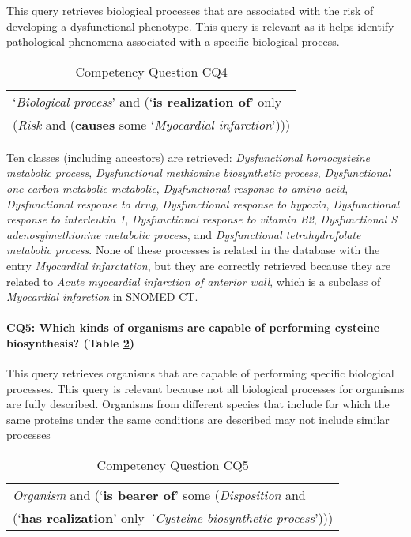 
This query retrieves biological processes that are associated with the risk of developing a dysfunctional phenotype. This query is relevant as it helps identify pathological phenomena associated with a specific biological process.
\begin{table}[H]
	\caption{Competency Question CQ4}
	\label{table:cq4}
	\centering
	\begin{tabular}{p{3in}}
		\hline
		`\textit{Biological process}' and (`\textbf{is realization of}' only \\ 
		\hspace{1cm}(\textit{Risk} and (\textbf{causes} some `\textit{Myocardial infarction}'))) \\
		\hline
	\end{tabular} 
\end{table}

Ten classes (including ancestors) are retrieved: \textit{Dysfunctional homocysteine metabolic process}, \textit{Dysfunctional methionine biosynthetic process}, \textit{Dysfunctional one carbon metabolic metabolic}, \textit{Dysfunctional response to amino acid}, \textit{Dysfunctional response to drug}, \textit{Dysfunctional response to hypoxia}, \textit{Dysfunctional response to interleukin 1}, \textit{Dysfunctional response to vitamin B2}, \textit{Dysfunctional S adenosylmethionine metabolic process}, and \textit{Dysfunctional tetrahydrofolate metabolic process}. None of these processes is related in the database with the entry \textit{Myocardial infarctation}, but they are correctly retrieved because they are related to \textit{Acute myocardial infarction of anterior wall}, which is a subclass of \textit{Myocardial infarction} in SNOMED CT. 

\paragraph{CQ5: Which kinds of organisms are capable of performing cysteine biosynthesis?  (Table \ref{table:cq5})}
This query retrieves organisms that are capable of performing specific biological processes. This query is relevant because not all biological processes for organisms are fully described. Organisms from different species that include for which the same proteins under the same conditions are described  may not include similar processes
\begin{table}[h!]
	\caption{Competency Question CQ5}
	\label{table:cq5}
		\centering
	\begin{tabular}{p{3in}}
		\hline
			\textit{Organism} and (`\textbf{is bearer of}'  some (\textit{Disposition} and \\
			\hspace{1cm} (`\textbf{has realization}' only \textit`\textit{Cysteine biosynthetic process}'))) \\
		\hline
	\end{tabular} 
\end{table}

